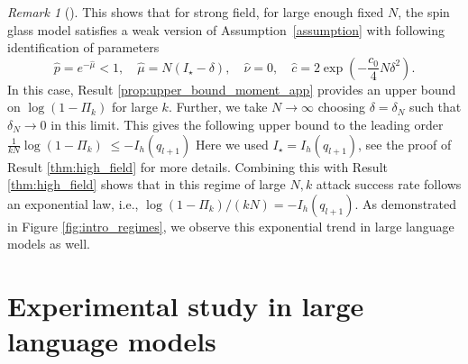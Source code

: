 \documentclass{article}
\theoremstyle{remark} %
\newtheorem{remark}{Remark}
\begin{document}
\begin{remark}[]
\label{rm:h_infty}
This shows that for strong field, for large enough fixed $N$, the spin glass model satisfies a weak version of Assumption~\ref{assumption} with following identification of parameters
\begin{equation}
    \hat p =e^{-\hat \mu}<1, \quad \hat \mu = N(I_\star-\delta), \quad \hat \nu = 0, \quad \hat c=2\exp\!\left(-\frac{c_0}{4}N\delta^2\right) .
\end{equation}
In this case, Result \ref{prop:upper_bound_moment_app} provides an upper bound on $ \log (1-\Pi_k)$ for large $k$.
Further, we take $N\to \infty$ choosing $\delta =\delta_N $ such that $\delta_N \to 0$ in this limit. This gives the following upper bound to the leading order $\frac{1}{kN}    \log (1-\Pi_k)
\;\leq- I_h(q_{l+1})$
Here we used $I_\star=I_h(q_{l+1})$, see the proof of Result \ref{thm:high_field} for more details.
Combining this with Result \ref{thm:high_field} shows that in this regime of large $N,k$ attack success rate follows an exponential law, i.e.,  $\log (1-\Pi_k)/(kN)
=- I_h(q_{l+1})$.
As demonstrated in Figure \ref{fig:intro_regimes}, we observe this exponential trend in large language models as well.
\end{remark}
\section{Experimental study in large language models}
\end{document}
